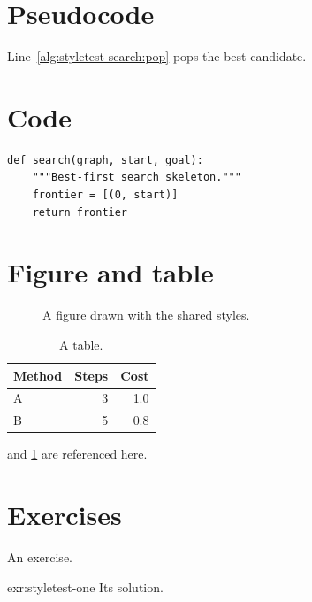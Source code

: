 \section{Pseudocode}
\begin{algorithm}[htb]
\caption{Best-first search skeleton}
\label{alg:styletest-search}
\end{algorithm}
Line~\ref{alg:styletest-search:pop} pops the best candidate.
\section{Code}
\begin{lstlisting}[caption={A listing.},label={lst:styletest-code}]
def search(graph, start, goal):
    """Best-first search skeleton."""
    frontier = [(0, start)]
    return frontier
\end{lstlisting}
\section{Figure and table}
\begin{figure}[tb]
  \centering
  \caption{A figure drawn with the shared styles.}
  \label{fig:styletest-grid}
\end{figure}
\begin{table}[tb]
  \centering\small
  \caption{A table.}
  \label{tab:styletest}
  \begin{tabular}{@{}lrr@{}}
  \toprule
  Method & Steps & Cost\\
  \midrule
  A & 3 & 1.0\\
  B & 5 & 0.8\\
  \bottomrule
  \end{tabular}
\end{table}
 and \cref{tab:styletest} are referenced here.
\section{Exercises}
\begin{exercise}[\difficulty{1}]\label{exr:styletest-one}
An exercise.
\end{exercise}
\begin{solution}{exr:styletest-one}
Its solution.
\end{solution}
